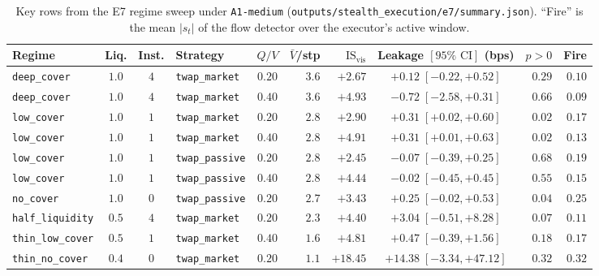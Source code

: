 \documentclass[11pt,a4paper]{article}
\newcommand{\code}[1]{\texttt{#1}}
\begin{document}
\begin{table}[h!]
\centering\footnotesize\setlength{\tabcolsep}{3.5pt}
\begin{tabular}{L{2.5cm} c c l c r r c r r}
\toprule
Regime & Liq. & Inst. & Strategy & $Q/V$ & $\bar V$/stp & $\text{IS}_{\text{vis}}$ & Leakage $[95\%\text{ CI}]$ (bps) & $p > 0$ & Fire \\
\midrule
\code{deep\_cover}     & $1.0$ & $4$ & \code{twap\_market}  & $0.20$ & $3.6$ & $+2.67$ & $+0.12\;[-0.22, +0.52]$ & $0.29$ & $0.10$ \\
\code{deep\_cover}     & $1.0$ & $4$ & \code{twap\_market}  & $0.40$ & $3.6$ & $+4.93$ & $-0.72\;[-2.58, +0.31]$ & $0.66$ & $0.09$ \\
\code{low\_cover}      & $1.0$ & $1$ & \code{twap\_market}  & $0.20$ & $2.8$ & $+2.90$ & $\mathbf{+0.31\;[+0.02, +0.60]}$ & $\mathbf{0.02}$ & $0.17$ \\
\code{low\_cover}      & $1.0$ & $1$ & \code{twap\_market}  & $0.40$ & $2.8$ & $+4.91$ & $\mathbf{+0.31\;[+0.01, +0.63]}$ & $\mathbf{0.02}$ & $0.13$ \\
\code{low\_cover}      & $1.0$ & $1$ & \code{twap\_passive} & $0.20$ & $2.8$ & $+2.45$ & $-0.07\;[-0.39, +0.25]$ & $0.68$ & $0.19$ \\
\code{low\_cover}      & $1.0$ & $1$ & \code{twap\_passive} & $0.40$ & $2.8$ & $+4.44$ & $-0.02\;[-0.45, +0.45]$ & $0.55$ & $0.15$ \\
\code{no\_cover}       & $1.0$ & $0$ & \code{twap\_passive} & $0.20$ & $2.7$ & $+3.43$ & $+0.25\;[-0.02, +0.53]$ & $0.04$ & $0.25$ \\
\code{half\_liquidity} & $0.5$ & $4$ & \code{twap\_market}  & $0.20$ & $2.3$ & $+4.40$ & $+3.04\;[-0.51, +8.28]$ & $0.07$ & $0.11$ \\
\code{thin\_low\_cover}& $0.5$ & $1$ & \code{twap\_market}  & $0.40$ & $1.6$ & $+4.81$ & $+0.47\;[-0.39, +1.56]$ & $0.18$ & $0.17$ \\
\code{thin\_no\_cover} & $0.4$ & $0$ & \code{twap\_market}  & $0.20$ & $1.1$ & $+18.45$& $+14.38\;[-3.34, +47.12]$ & $0.32$ & $0.32$ \\
\bottomrule
\end{tabular}
\caption{Key rows from the E7 regime sweep under \code{A1-medium} (\code{outputs/stealth\_execution/e7/summary.json}).
``Fire'' is the mean $|s_t|$ of the flow detector over the executor's active window.}
\label{tab:e7_results}
\end{table}
\end{document}

